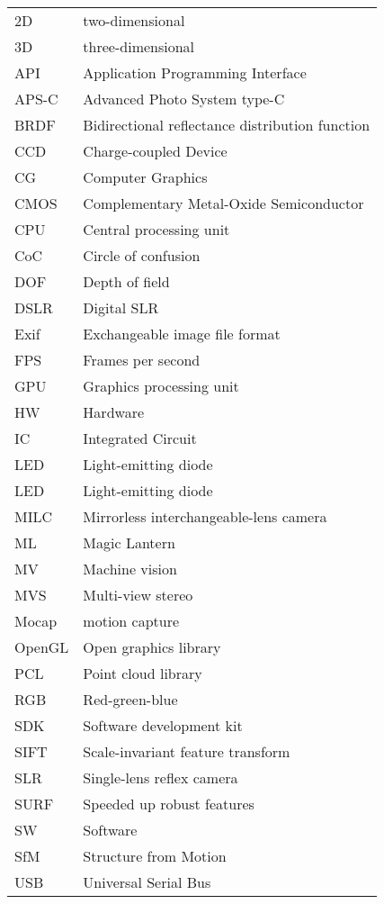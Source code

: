 \begin{tabular}{ll}
	2D & two-dimensional\\
	3D & three-dimensional\\
	API & Application Programming Interface\\
	APS-C & Advanced Photo System type-C\\
	BRDF & Bidirectional reflectance distribution function\\
	CCD & Charge-coupled Device\\
	CG & Computer Graphics\\
	CMOS & Complementary Metal-Oxide Semiconductor\\
	CPU & Central processing unit\\
	CoC & Circle of confusion\\
	DOF & Depth of field\\
	DSLR & Digital SLR\\
	Exif & Exchangeable image file format\\
	FPS & Frames per second\\
	GPU & Graphics processing unit\\
	HW & Hardware\\
	IC & Integrated Circuit\\
	LED & Light-emitting diode\\
	LED & Light-emitting diode\\
	MILC & Mirrorless interchangeable-lens camera\\
	ML & Magic Lantern\\
	MV & Machine vision\\
	MVS & Multi-view stereo\\
	Mocap & motion capture\\
	OpenGL & Open graphics library\\
	PCL & Point cloud library\\
	RGB & Red-green-blue\\
	SDK & Software development kit\\
	SIFT & Scale-invariant feature transform\\
	SLR & Single-lens reflex camera\\
	SURF & Speeded up robust features \\
	SW & Software\\
	SfM & Structure from Motion\\
	USB & Universal Serial Bus\\
\end{tabular}

